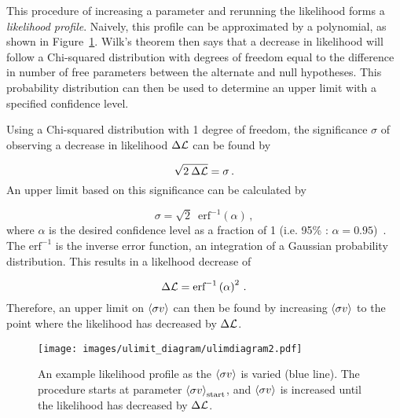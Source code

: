This procedure of increasing a parameter and rerunning the likelihood forms a \textit{likelihood profile}.
Naively, this profile can be approximated by a polynomial, as shown in Figure~\ref{fig:ulimitdiag}.
Wilk's theorem then says that a decrease in likelihood will follow a Chi-squared distribution with degrees of freedom equal to the difference in number of free parameters between the alternate and null hypotheses.
This probability distribution can then be used to determine an upper limit with a specified confidence level.

Using a Chi-squared distribution with 1 degree of freedom, the significance $\sigma$ of observing a decrease in likelihood $\Delta\mathcal{L}$ can be found by

\begin{equation}\label{eqn:likeul1}
  \sqrt{2 \: \Delta\mathcal{L}} = \sigma \,.
\end{equation}
An upper limit based on this significance can be calculated by

\begin{equation}\label{eqn:likeul2}
  \sigma = \sqrt{2} \;\: \textrm{erf}^{-1} \left ( \alpha \right ) \,,
\end{equation}
where $\alpha$ is the desired confidence level as a fraction of 1 (i.e. 95\% : $\alpha=0.95$)~\cite{wilks1938,cash1979}.
The $\textrm{erf}^{-1}$ is the inverse error function, an integration of a Gaussian probability distribution.
This results in a likelhood decrease of

\begin{equation}\label{eqn:likeul3}
  \Delta\mathcal{L} = \textrm{erf}^{-1} \left ( \alpha \right )^2 \,.
\end{equation}
Therefore, an upper limit on $\left \langle \sigma v \right \rangle$ can then be found by increasing $\left \langle \sigma v \right \rangle$ to the point where the likelihood has decreased by $\Delta\mathcal{L}$.

%
%
%
%

\begin{figure}[bt]
  \centering
  \texttt{[image: images/ulimit\_diagram/ulimdiagram2.pdf]}
  \caption[Upper Limit Calculation]{
    An example likelihood profile as the $\left \langle \sigma v \right \rangle$ is varied (blue line).
    The procedure starts at parameter $\left \langle \sigma v \right \rangle_{\mathrm{start}}$, and $\left \langle \sigma v \right \rangle$ is increased until the likelihood has decreased by $\Delta{}\mathcal{L}$.
  }
  \label{fig:ulimitdiag}
\end{figure}

